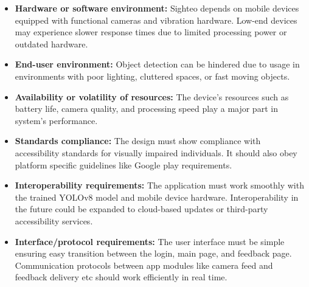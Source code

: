 \documentclass{FastFyp}
\begin{document}
\begin{itemize}
    \item \textbf{Hardware or software environment:} Sighteo depends on mobile devices equipped with functional cameras and vibration hardware. Low-end devices may experience slower response times due to limited processing power or outdated hardware.
\item \textbf{End-user environment:} Object detection can be hindered due to usage in environments with poor lighting, cluttered spaces, or fast moving objects.
\item \textbf{Availability or volatility of resources:} The device's resources such as battery life, camera quality, and processing speed play a major part in system's performance. 
\item \textbf{Standards compliance:} The design must show compliance with accessibility standards for visually impaired individuals. It should also obey platform specific guidelines like Google play requirements.
\item \textbf{Interoperability requirements:} The application must work smoothly with the trained YOLOv8 model and mobile device hardware. Interoperability in the future could be expanded to cloud-based updates or third-party accessibility services.
\item \textbf{Interface/protocol requirements:} The user interface must be simple ensuring easy transition between the login, main page, and feedback page. Communication protocols between app modules like camera feed and feedback delivery etc should work efficiently in real time.


\end{itemize}
\end{document}
